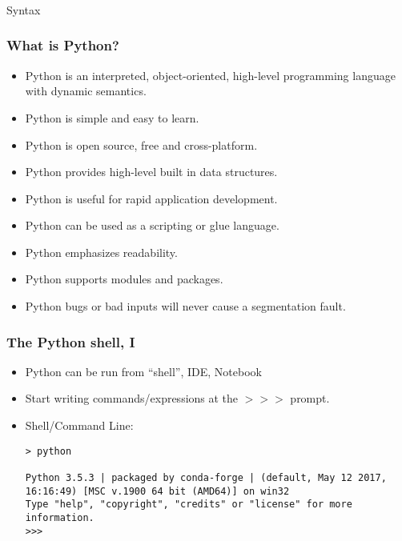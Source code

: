 \begin{frame}[fragile]\frametitle{}
\begin{center}
{\Large Syntax}
\end{center}

\end{frame}
\begin{frame}[fragile]  \frametitle{What is Python?}
\begin{itemize}
\item Python is an interpreted, object-oriented, high-level programming language with dynamic semantics.
\item Python is simple and easy to learn.
\item Python is open source, free and cross-platform.
\item Python provides high-level built in data structures.
\item Python is useful for rapid application development.
\item Python can be used as a scripting or glue language.
\item Python emphasizes readability.
\item Python supports modules and packages.
\item Python bugs or bad inputs will never cause a segmentation fault.
\end{itemize}
\end{frame}

\begin{frame}[fragile]  \frametitle{The Python shell, I}
  \begin{itemize}
  \item Python can be run from ``shell'', IDE, Notebook
	\item Start writing commands/expressions at the $>>>$ prompt.
 \item Shell/Command Line:
\begin{lstlisting}
> python

Python 3.5.3 | packaged by conda-forge | (default, May 12 2017, 16:16:49) [MSC v.1900 64 bit (AMD64)] on win32
Type "help", "copyright", "credits" or "license" for more information.
>>>
\end{lstlisting}
\end{itemize}
\end{frame}

